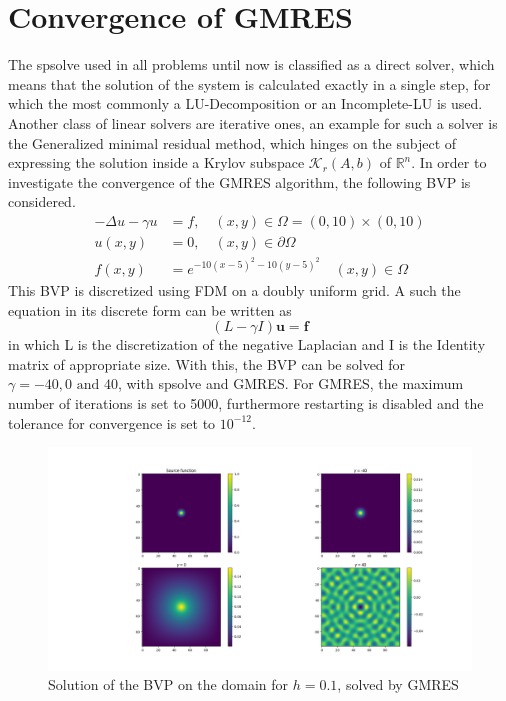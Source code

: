 \documentclass{article}
\begin{document}
\section{Convergence of GMRES}
The spsolve used in all problems until now is classified as a direct solver, which means that the solution of the system is calculated exactly in a single step, for which the most commonly a LU-Decomposition or an Incomplete-LU is used. Another class of linear solvers are iterative ones, an example for such a solver is the Generalized minimal residual method, which hinges on the subject of expressing the solution inside a Krylov subspace $\mathcal{K}_{r}(A, b)$ of $\mathbb{R}^n$.
In order to investigate the convergence of the GMRES algorithm, the following BVP is considered.
\begin{equation}
\begin{aligned}-\Delta u-\gamma u &=f, \quad(x, y) \in \Omega=(0,10) \times(0,10) \\ u(x, y) &=0, \quad(x, y) \in \partial \Omega \\ f(x, y) &=e^{-10(x-5)^{2}-10(y-5)^{2}} \quad(x, y) \in \Omega \end{aligned}
\end{equation}
This BVP is discretized using FDM on a doubly uniform grid. A such the equation in its discrete form can be written as
\begin{equation}
\left(L-\gamma I \right)\mathbf{u} = \mathbf{f}
\end{equation}
in which L is the discretization of the negative Laplacian and I is the Identity matrix of appropriate size.
With this, the BVP can be solved for $\gamma=-40,0 \text{ and } 40$, with spsolve and GMRES. For GMRES, the maximum number of iterations is set to 5000, furthermore restarting is disabled and the tolerance for convergence is set to $10^{-12}$.
\begin{figure}[H]
	\centering
	\includegraphics[width=.9\linewidth]{5sol.png}
	\caption{Solution of the BVP on the domain for $h=0.1$, solved by GMRES}
\end{figure}
\end{document}
